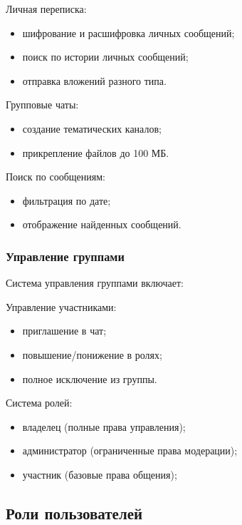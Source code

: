 Личная переписка:

	\begin{itemize}
		\item шифрование и расшифровка личных сообщений;
		\item поиск по истории личных сообщений;
		\item отправка вложений разного типа.
	\end{itemize}
	
Групповые чаты:

	\begin{itemize}
		\item создание тематических каналов;
		\item прикрепление файлов до 100 МБ.
	\end{itemize}
	
Поиск по сообщениям:

	\begin{itemize}
		\item фильтрация по дате;
		\item отображение найденных сообщений.
	\end{itemize}
	
\subsubsection{Управление группами}

Система управления группами включает:
	
Управление участниками:

	\begin{itemize}
		\item приглашение в чат;
		\item повышение/понижение в ролях;
		\item полное исключение из группы.
	\end{itemize}
	
Система ролей:

	\begin{itemize}
		\item владелец (полные права управления);
		\item администратор (ограниченные права модерации);
		\item участник (базовые права общения);
	\end{itemize}
	

\subsection{Роли пользователей}

